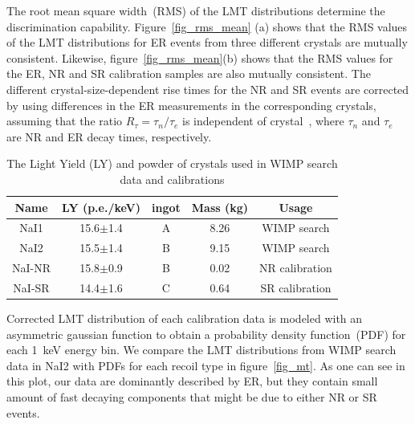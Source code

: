 \documentclass[a4paper,11pt]{article}
\begin{document}
The root mean square width~(RMS) of the LMT distributions determine the discrimination capability. 
Figure~\ref{fig_rms_mean} (a) shows that the RMS values of the LMT distributions for ER events from three different crystals
are mutually consistent.  Likewise,  figure~\ref{fig_rms_mean}(b) shows that the RMS values for the ER, NR and SR calibration
samples are also mutually consistent.  The different crystal-size-dependent rise times for the  NR and SR events are corrected
by using  differences in the ER measurements in the corresponding crystals, assuming that the ratio $R_{\tau}=\tau_{n}/\tau_{e}$
is independent of crystal~\cite{ahmed03,Lee:2007af,sckim12}, where $\tau_{n}$ and $\tau_{e}$ are NR and ER decay times, respectively.

\begin{table}[tbp]
\centering
\begin{tabular}{|c|c|c|c|c|}
\hline
Name & LY (p.e./keV) & ingot & Mass (kg) & Usage\\
\hline
NaI1 & 15.6$\pm$1.4 & A & 8.26 &WIMP search \\
NaI2 & 15.5$\pm$1.4 & B & 9.15 &WIMP search\\
NaI-NR& 15.8$\pm$0.9 & B& 0.02 &NR calibration\\
NaI-SR& 14.4$\pm$1.6 & C& 0.64 &SR calibration\\
\hline
\end{tabular}
\caption{\label{tab_lightyield} The Light Yield (LY) and powder of crystals used in WIMP search data and calibrations}
\end{table}


Corrected LMT distribution of each calibration data is modeled with an asymmetric gaussian function to obtain a probability density function~(PDF) for each 1~keV energy bin. %
We compare the LMT distributions from WIMP search data in NaI2 with PDFs for each recoil type in figure~\ref{fig_mt}. As one can see in this plot, our data are dominantly described by ER, but they contain small amount of fast decaying components that might be due to either NR or SR events. 
\end{document}

